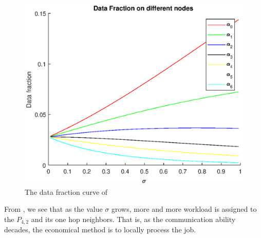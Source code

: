 \begin{figure}[!ht]
\centering
\includegraphics[width=1\columnwidth]{figure/rt_no_fraction.eps}
\caption{The data fraction curve of  }
\label{fig:rt_no_fraction}
\end{figure}

From ,  we see that as the value $\sigma$ grows, more and more workload is assigned to the $P_{4, 2}$ and its one hop neighbors.   That is,  as the communication ability decades,  the economical method is to locally process the job. 
\newpage